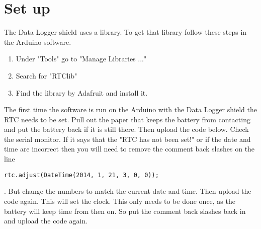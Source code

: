 \section{Set up}
	The Data Logger shield uses a library. To get that library follow these steps in the Arduino software.
	\begin{enumerate}
		\item Under "Tools" go to "Manage Libraries ..."
		\item Search for "RTClib"
		\item Find the library by Adafruit and install it.
	\end{enumerate}

    The first time the software is run on the Arduino with the Data Logger shield the RTC needs to be set.  Pull out the paper that keeps the battery from contacting and put the battery back if it is still there. Then upload the code below. Check the serial monitor. If it says that the "RTC has not been set!" or if the date and time are incorrect then you will need to remove the comment back slashes on the line 
    \begin{lstlisting}[language=Arduino]
    rtc.adjust(DateTime(2014, 1, 21, 3, 0, 0));
    \end{lstlisting}
    . But change the numbers to match the current date and time. Then upload the code again. This will set the clock. This only needs to be done once, as the battery will keep time from then on. So put the comment back slashes back in and upload the code again.

